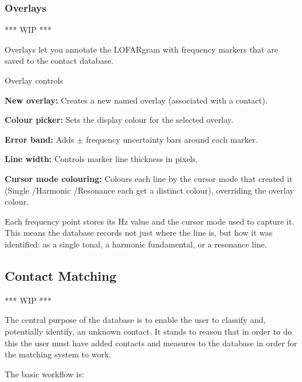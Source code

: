 \subsubsection{Overlays}
\textcolor{commentGreen}{*** WIP ***}

Overlays let you annotate the LOFARgram with frequency markers that are saved to the contact database.

Overlay controls

\begin{compactitem}
    \item \textbf{New overlay:} Creates a new named overlay (associated with a contact).
    \item \textbf{Colour picker:} Sets the display colour for the selected overlay.
    \item \textbf{Error band:} Adds $\pm$ frequency uncertainty bars around each marker.
    \item \textbf{Line width:} Controls marker line thickness in pixels.
    \item \textbf{Cursor mode colouring:} Colours each line by the cursor mode that created it (Single /Harmonic /Resonance each get a distinct colour), overriding the overlay colour.
\end{compactitem}

Each frequency point stores its Hz value and the cursor mode used to capture it. This means the database records not just where the line is, but how it was identified: as a single tonal, a harmonic fundamental, or a resonance line.

\subsection{Contact Matching}
\textcolor{commentGreen}{*** WIP ***}

The central purpose of the database is to enable the user to classify and, potentially identify, an unknown contact. It stands to reason that in order to do this the user must have added contacts and measures to the database in order for the matching system to work.

The basic workflow is:

